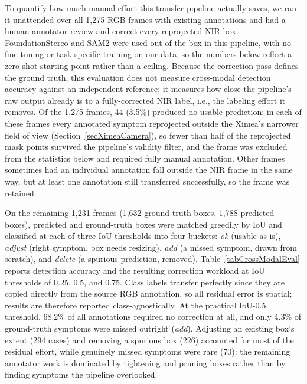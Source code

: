 To quantify how much manual effort this transfer pipeline actually
saves, we ran it unattended over all 1{,}275 RGB frames with existing
annotations and had a human annotator review and correct every
reprojected NIR box.
FoundationStereo and SAM2 were used out of the box in this pipeline,
with no fine-tuning or task-specific training on our data, so the
numbers below reflect a zero-shot starting point rather than a
ceiling.
Because the correction pass defines the ground truth, this evaluation
does not measure cross-modal detection accuracy against an
independent reference; it measures how close the pipeline's raw
output already is to a fully-corrected NIR label, i.e., the labeling
effort it removes.
Of the 1{,}275 frames, 44 (3.5\%) produced no usable prediction: in each
of these frames every annotated symptom reprojected outside the
Ximea's narrower field of view (Section~\ref{secXimeaCamera}), so
fewer than half of the reprojected mask points survived the
pipeline's validity filter, and the frame was excluded from the
statistics below and required fully manual annotation.
Other frames sometimes had an individual annotation fall outside the
NIR frame in the same way, but at least one annotation still
transferred successfully, so the frame was retained.

On the remaining 1{,}231 frames (1{,}632 ground-truth boxes, 1{,}788
predicted boxes), predicted and ground-truth boxes were matched
greedily by IoU and classified at each of three IoU thresholds into
four buckets: \emph{ok} (usable as is), \emph{adjust} (right symptom,
box needs resizing), \emph{add} (a missed symptom, drawn from
scratch), and \emph{delete} (a spurious prediction, removed).
Table~\ref{tabCrossModalEval} reports detection accuracy and the
resulting correction workload at IoU thresholds of 0.25, 0.5, and
0.75.
Class labels transfer perfectly since they are copied directly from
the source RGB annotation, so all residual error is spatial; results
are therefore reported class-agnostically.
At the practical IoU-0.5 threshold, 68.2\% of all annotations required
no correction at all, and only 4.3\% of ground-truth symptoms were missed
outright (\emph{add}). Adjusting an existing box's extent (294 cases) and
removing a spurious box (226) accounted for most of the residual effort,
while genuinely missed symptoms were rare (70): the remaining annotator
work is dominated by tightening and pruning boxes rather than by finding
symptoms the pipeline overlooked.

